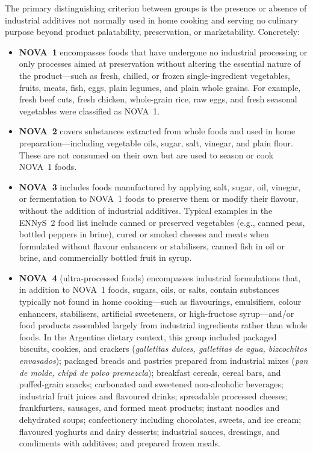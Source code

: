 ﻿\documentclass{article}
\begin{document}
The primary distinguishing criterion between groups is the presence or absence of industrial additives not normally used in home cooking and serving no culinary purpose beyond product palatability, preservation, or marketability. Concretely:

\begin{itemize}
  \item \textbf{NOVA~1} encompasses foods that have undergone no industrial processing or only processes aimed at preservation without altering the essential nature of the product---such as fresh, chilled, or frozen single-ingredient vegetables, fruits, meats, fish, eggs, plain legumes, and plain whole grains. For example, fresh beef cuts, fresh chicken, whole-grain rice, raw eggs, and fresh seasonal vegetables were classified as NOVA~1.

  \item \textbf{NOVA~2} covers substances extracted from whole foods and used in home preparation---including vegetable oils, sugar, salt, vinegar, and plain flour. These are not consumed on their own but are used to season or cook NOVA~1 foods.

  \item \textbf{NOVA~3} includes foods manufactured by applying salt, sugar, oil, vinegar, or fermentation to NOVA~1 foods to preserve them or modify their flavour, without the addition of industrial additives. Typical examples in the ENNyS~2 food list include canned or preserved vegetables (e.g., canned peas, bottled peppers in brine), cured or smoked cheeses and meats when formulated without flavour enhancers or stabilisers, canned fish in oil or brine, and commercially bottled fruit in syrup.

  \item \textbf{NOVA~4} (ultra-processed foods) encompasses industrial formulations that, in addition to NOVA~1 foods, sugars, oils, or salts, contain substances typically not found in home cooking---such as flavourings, emulsifiers, colour enhancers, stabilisers, artificial sweeteners, or high-fructose syrup---and/or food products assembled largely from industrial ingredients rather than whole foods. In the Argentine dietary context, this group included packaged biscuits, cookies, and crackers (\textit{galletitas dulces, galletitas de agua, bizcochitos envasados}); packaged breads and pastries prepared from industrial mixes (\textit{pan de molde, chip\'a de polvo premezcla}); breakfast cereals, cereal bars, and puffed-grain snacks; carbonated and sweetened non-alcoholic beverages; industrial fruit juices and flavoured drinks; spreadable processed cheeses; frankfurters, sausages, and formed meat products; instant noodles and dehydrated soups; confectionery including chocolates, sweets, and ice cream; flavoured yoghurts and dairy desserts; industrial sauces, dressings, and condiments with additives; and prepared frozen meals.
\end{itemize}
\end{document}
